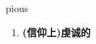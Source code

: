 
\begin{frame}
{\huge pious}
\begin{center}
\begin{enumerate}\Large
  \item \textbf{(信仰上)虔诚的}
\end{enumerate}
\end{center}
\end{frame}
